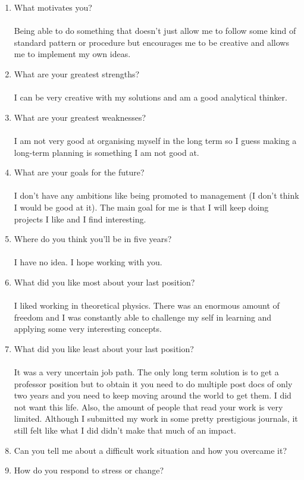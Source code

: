 \documentclass[12pt,a4paper,twoside]{article}
\begin{document}
\begin{enumerate}
		\item What motivates you?\\\\
		Being able to do something that doesn't just allow me to follow some kind of standard pattern or procedure but encourages me to be creative and allows me to implement my own ideas.
		\item What are your greatest strengths?\\\\
		I can be very creative with my solutions and am a good analytical thinker.
		\item What are your greatest weaknesses?\\\\
		I am not very good at organising myself in the long term so I guess making a long-term planning is something I am not good at.
		\item What are your goals for the future?\\\\
		I don't have any ambitions like being promoted to management (I don't think I would be good at it). The main goal for me is that I will keep doing projects I like and I find interesting.
		\item Where do you think you'll be in five years?\\\\
		I have no idea. I hope working with you.
		\item What did you like most about your last position?\\\\
		I liked working in theoretical physics. There was an enormous amount of freedom and I was constantly able to challenge my self in learning and applying some very interesting concepts.
		\item What did you like least about your last position?\\\\
		It was a very uncertain job path. The only long term solution is to get a professor position but to obtain it you need to do multiple post docs of only two years and you need to keep moving around the world to get them. I did not want this life. Also, the amount of people that read your work is very limited. Although I submitted my work in some pretty prestigious journals, it still felt like what I did didn't make that much of an impact.
		\item Can you tell me about a difficult work situation and how you overcame it?
		\item How do you respond to stress or change?\\\\

\end{enumerate}
\end{document}
